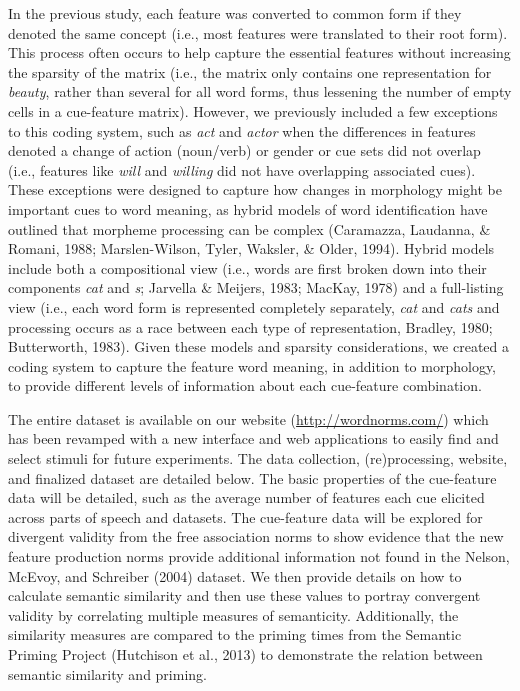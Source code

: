 \documentclass[english,,man]{apa6}
\theoremstyle{definition}
\theoremstyle{definition}
\theoremstyle{definition}
\theoremstyle{remark}
\begin{document}
In the previous study, each feature was converted to common form if they
denoted the same concept (i.e., most features were translated to their
root form). This process often occurs to help capture the essential
features without increasing the sparsity of the matrix (i.e., the matrix
only contains one representation for \emph{beauty}, rather than several
for all word forms, thus lessening the number of empty cells in a
cue-feature matrix). However, we previously included a few exceptions to
this coding system, such as \emph{act} and \emph{actor} when the
differences in features denoted a change of action (noun/verb) or gender
or cue sets did not overlap (i.e., features like \emph{will} and
\emph{willing} did not have overlapping associated cues). These
exceptions were designed to capture how changes in morphology might be
important cues to word meaning, as hybrid models of word identification
have outlined that morpheme processing can be complex (Caramazza,
Laudanna, \& Romani, 1988; Marslen-Wilson, Tyler, Waksler, \& Older,
1994). Hybrid models include both a compositional view (i.e., words are
first broken down into their components \emph{cat} and \emph{s};
Jarvella \& Meijers, 1983; MacKay, 1978) and a full-listing view (i.e.,
each word form is represented completely separately, \emph{cat} and
\emph{cats} and processing occurs as a race between each type of
representation, Bradley, 1980; Butterworth, 1983). Given these models
and sparsity considerations, we created a coding system to capture the
feature word meaning, in addition to morphology, to provide different
levels of information about each cue-feature combination.

The entire dataset is available on our website
(\url{http://wordnorms.com/}) which has been revamped with a new
interface and web applications to easily find and select stimuli for
future experiments. The data collection, (re)processing, website, and
finalized dataset are detailed below. The basic properties of the
cue-feature data will be detailed, such as the average number of
features each cue elicited across parts of speech and datasets. The
cue-feature data will be explored for divergent validity from the free
association norms to show evidence that the new feature production norms
provide additional information not found in the Nelson, McEvoy, and
Schreiber (2004) dataset. We then provide details on how to calculate
semantic similarity and then use these values to portray convergent
validity by correlating multiple measures of semanticity. Additionally,
the similarity measures are compared to the priming times from the
Semantic Priming Project (Hutchison et al., 2013) to demonstrate the
relation between semantic similarity and priming.
\end{document}
